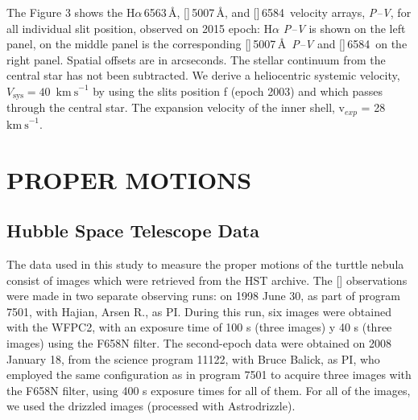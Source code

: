 \documentclass{aa}
\makeatletter
\newcommand{\kms}{\ensuremath{\mathrm{km\ s}^{-1}}}
\newcommand{\nii}{[\ion{N}{2}]}
\newcommand\NIIlam{[\ion{N}{2}]\,6584\,}
\newcommand\OIIIlam{[\ion{O}{3}]\,5007\,\AA\@}
\newcommand\Halam{H$\alpha$\,6563\,\AA\@}
\newcommand\Ha{\ensuremath{\mathrm{H}\alpha}}
\newcommand{\vsys}{\ensuremath{V_\mathrm{sys}}}
\makeatother
\begin{document}
The Figure 3 shows the \Halam{},  \OIIIlam{}, and \NIIlam{} velocity arrays, {\it P--V}, for all individual slit position, observed on 2015 epoch: \Ha{} {\it P--V} is shown on the left panel,  on
the middle panel is the corresponding \OIIIlam\, {\it P--V} and \NIIlam{} on the right panel. Spatial
offsets are in arcseconds.  The stellar continuum from the central star
has not been subtracted. We derive a heliocentric
systemic velocity, \vsys $=40$~\kms{} by using the slits position f (epoch 2003) and  which passes through the central star. The expansion velocity of the inner shell, v$_{exp}$ = 28 \kms.
\section{PROPER MOTIONS}
 \subsection{Hubble Space Telescope Data} 
The data used in this study to measure the proper motions of the turttle nebula consist of images which were retrieved from the HST archive. The \nii{} observations were made in two separate observing runs: on 1998 June 30, as part of program 7501, with Hajian, Arsen R., as PI. During this run, six images were obtained with the WFPC2, with an exposure time of 100 s (three images) y 40 s (three images) using the F658N filter. The second-epoch data were obtained on 2008 January 18, from the science program 11122, with Bruce Balick, as PI, who employed the same configuration as in program 7501 to acquire three images with the F658N filter, using 400 s exposure times for all of them. For all of the images, we used the drizzled images (processed with Astrodrizzle). 


\vfill \eject
\end{document}
